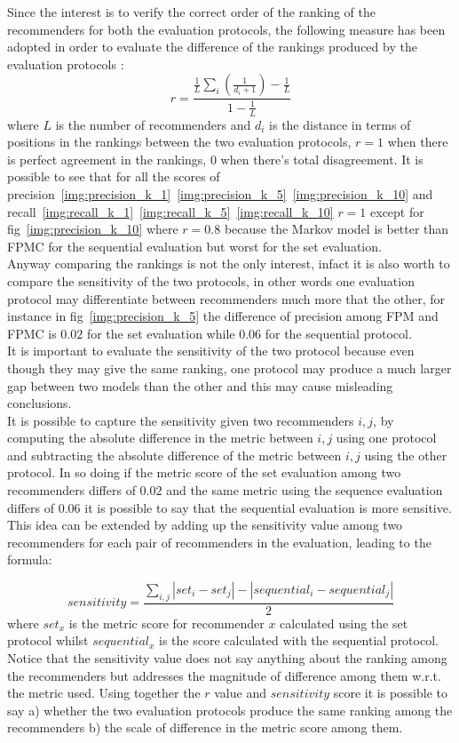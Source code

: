 \documentclass[prodmode,acmtecs]{acmsmall} %
\begin{document}
Since the interest is to verify the correct order of the ranking of the recommenders for both the evaluation protocols, the following measure has been adopted in order to evaluate the difference of the rankings produced by the evaluation protocols :
\[ r = \frac{\frac{1}{L} \sum_{i}(\frac{1}{d_i + 1}) - \frac{1}{L}} {1-\frac{1}{L}} \]
where $L$ is the number of recommenders and $d_i$ is the distance in terms of positions in the rankings between the two evaluation protocols, $r=1$ when there is perfect agreement in the rankings, $0$ when there's total disagreement. It is possible to see that for all the scores of precision~\ref{img:precision_k_1}~\ref{img:precision_k_5}~\ref{img:precision_k_10} and recall~\ref{img:recall_k_1}~\ref{img:recall_k_5}~\ref{img:recall_k_10} $r=1$ except for fig~\ref{img:precision_k_10} where $r=0.8$ because the Markov model is better than FPMC for the sequential evaluation but worst for the set evaluation.\\
Anyway comparing the rankings is not the only interest, infact it is also worth to compare the sensitivity of the two protocols, in other words one evaluation protocol may differentiate between recommenders much more that the other, for instance in fig~\ref{img:precision_k_5} the difference of precision among FPM and FPMC is $0.02$ for the set evaluation while $0.06$ for the sequential protocol.\\ It is important to evaluate the sensitivity of the two protocol because even though they may give the same ranking, one protocol may produce a much larger gap between two models than the other and this may cause misleading conclusions.\\
It is possible to capture the sensitivity given two recommenders $i,j$, by computing the absolute difference in the metric between $i,j$ using one protocol and subtracting the absolute difference of the metric between $i,j$ using the other protocol. In so doing if the metric score of the set evaluation among two recommenders differs of $0.02$ and the same metric using the sequence evaluation differs of $0.06$ it is possible to say that the sequential evaluation is more sensitive. This idea can be extended by adding up the sensitivity value among two recommenders for each pair of recommenders in the evaluation, leading to the formula:

\[sensitivity = \frac{\sum_{i,j} |set_i - set_j| - |sequential_i-sequential_j|}{2} \]
where $set_x$ is the metric score for recommender $x$ calculated using the set protocol whilst $sequential_x$ is the score calculated with the sequential protocol.
Notice that the sensitivity value does not say anything about the ranking among the recommenders but addresses the magnitude of difference among them w.r.t. the metric used. Using together the $r$ value and $sensitivity$ score it is possible to say a) whether the two evaluation protocols produce the same ranking among the recommenders b) the scale of difference in the metric score among them.
\end{document}
